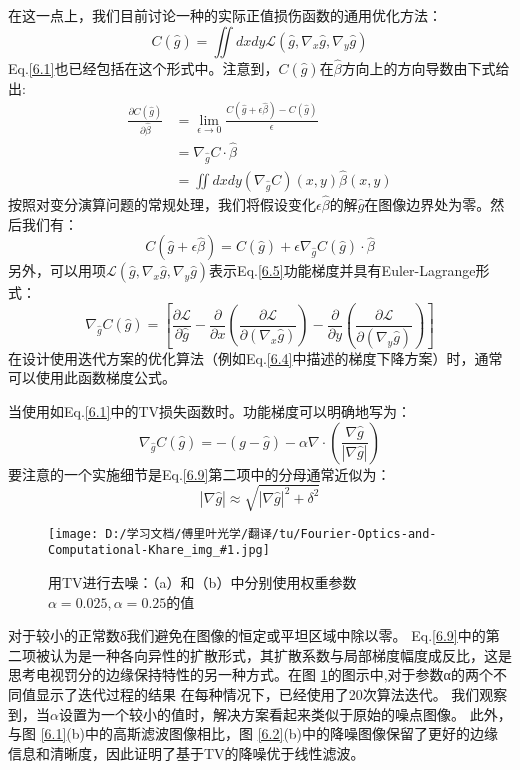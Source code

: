\documentclass[12pt, UTF8]{ctexart}%
\numberwithin{equation}{section}
\numberwithin{figure}{section}
\newcommand {\InsertPic}[3]{\begin{figure}[htbp]\centering \texttt{[image: D:/学习文档/傅里叶光学/翻译/tu/Fourier-Optics-and-Computational-Khare\_img\_\#1.jpg]}\caption{#3}  \label{#2}\end{figure}}%
\newcommand{\InsertEqution}[2]{\begin{equation}
  \label{#1}
   #2
 \end{equation}}
\newcommand{\RefEq}[1]{Eq.\ref{#1}}
\newcommand{\InsertInlineEq}[1]{$#1$}
\newcommand{\RefFig}[1]{图 \ref{#1}}
\begin{document}
\begin{sloppypar}
在这一点上，我们目前讨论一种的实际正值损伤函数的通用优化方法：
\InsertEqution{6.5}{C(\hat{g})=\iint d x d y \mathcal{L}\left(\hat{g}, \nabla_{x} \hat{g}, \nabla_{y} \hat{g}\right)}
\RefEq{6.1}也已经包括在这个形式中。注意到，\InsertInlineEq{C(\hat{g})}在\InsertInlineEq{\hat{\beta}}方向上的方向导数由下式给出:
\InsertEqution{6.6}{\begin{aligned}
  \frac{\partial C(\hat{g})}{\partial \hat{\beta}} &=\lim _{\epsilon \rightarrow 0} \frac{C(\hat{g}+\epsilon \hat{\beta})-C(\hat{g})}{\epsilon} \\
  &=\nabla_{\hat{g}} C \cdot \hat{\beta} \\
  &=\iint d x d y\left(\nabla_{\hat{g}} C\right)(x, y) \hat{\beta}(x, y)
  \end{aligned}}
  按照对变分演算问题的常规处理，我们将假设变化\InsertInlineEq{\epsilon \hat{\beta}}的解\InsertInlineEq{\hat{g}}在图像边界处为零。然后我们有：
  \InsertEqution{6.7}{C(\hat{g}+\epsilon \hat{\beta})=C(\hat{g})+\epsilon \nabla_{\hat{g}} C(\hat{g}) \cdot \hat{\beta}}
  另外，可以用项\InsertInlineEq{\mathcal{L}\left(\hat{g}, \nabla_{x} \hat{g}, \nabla_{y} \hat{g}\right)}表示\RefEq{6.5}功能梯度并具有Euler-Lagrange形式：
  \InsertEqution{6.8}{\nabla_{\hat{g}} C(\hat{g})=\left[\frac{\partial \mathcal{L}}{\partial \hat{g}}-\frac{\partial}{\partial x}\left(\frac{\partial \mathcal{L}}{\partial\left(\nabla_{x} \hat{g}\right)}\right)-\frac{\partial}{\partial y}\left(\frac{\partial \mathcal{L}}{\partial\left(\nabla_{y} \hat{g}\right)}\right)\right]}
  在设计使用迭代方案的优化算法（例如\RefEq{6.4}中描述的梯度下降方案）时，通常可以使用此函数梯度公式。

  当使用如\RefEq{6.1}中的TV损失函数时。功能梯度可以明确地写为：
  \InsertEqution{6.9}{\nabla_{\hat{g}} C(\hat{g})=-(g-\hat{g})-\alpha \nabla \cdot\left(\frac{\nabla \hat{g}}{|\nabla \hat{g}|}\right)} 
  要注意的一个实施细节是\RefEq{6.9}第二项中的分母通常近似为：
  \InsertEqution{6.10}{|\nabla \hat{g}| \approx \sqrt{|\nabla \hat{g}|^{2}+\delta^{2}}}
  \InsertPic{24}{F6.2}{用TV进行去噪：（a）和（b）中分别使用权重参数\InsertInlineEq{\alpha=0.025,\alpha=0.25}的值}
  对于较小的正常数δ我们避免在图像的恒定或平坦区域中除以零。 \RefEq{6.9}中的第二项被认为是一种各向异性的扩散形式，其扩散系数与局部梯度幅度成反比，这是思考电视罚分的边缘保持特性的另一种方式。在\RefFig{F6.2}的图示中,对于参数α的两个不同值显示了迭代过程的结果 在每种情况下，已经使用了20次算法迭代。 我们观察到，当\InsertInlineEq{\alpha}设置为一个较小的值时，解决方案看起来类似于原始的噪点图像。 此外，与\RefFig{6.1}(b)中的高斯滤波图像相比，\RefFig{6.2}(b)中的降噪图像保留了更好的边缘信息和清晰度，因此证明了基于TV的降噪优于线性滤波。

\end{sloppypar}
\end{document}
